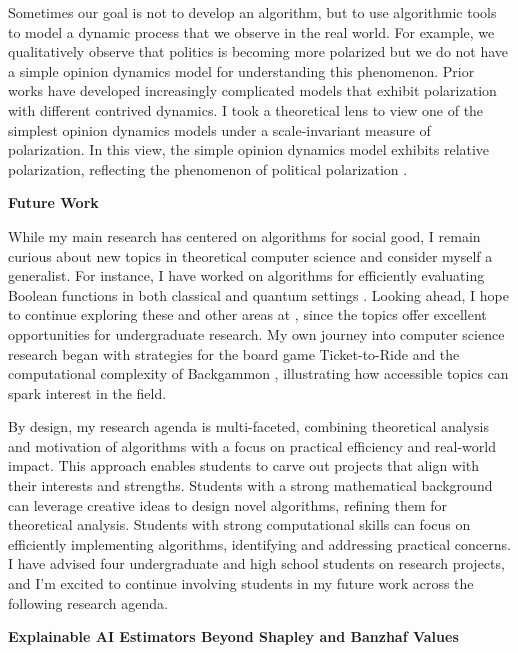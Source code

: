 \documentclass[11pt]{article}
\begin{document}
{Sometimes our goal is not to develop an algorithm, but to use algorithmic tools to model a dynamic process that we observe in the real world. For example, we qualitatively observe that politics is becoming more polarized but we do not have a simple opinion dynamics model for understanding this phenomenon. Prior works have developed increasingly complicated models that exhibit polarization with different contrived dynamics. I took a theoretical lens to view one of the simplest opinion dynamics models under a scale-invariant measure of polarization. In this view, the simple opinion dynamics model exhibits relative polarization, reflecting the phenomenon of political polarization \cite{musco2022quantify}.

\begin{center}
{\large \textbf{Future Work}}
\end{center}

While my main research has centered on algorithms for social good, I remain curious about new topics in theoretical computer science and consider myself a generalist. For instance, I have worked on algorithms for efficiently evaluating Boolean functions in both classical \cite{hellerstein2022adaptivity} and quantum settings \cite{czekanski2023robust,kimmel2021query,delorenzo2019applications}. Looking ahead, I hope to continue exploring these and other areas at \school, since the topics offer excellent opportunities for undergraduate research. My own journey into computer science research began with strategies for the board game Ticket-to-Ride \cite{witter2020applications} and the computational complexity of Backgammon \cite{witter2021backgammon}, illustrating how accessible topics can spark interest in the field.

By design, my research agenda is multi-faceted, combining theoretical analysis and motivation of algorithms with a focus on practical efficiency and real-world impact. This approach enables students to carve out projects that align with their interests and strengths. Students with a strong mathematical background can leverage creative ideas to design novel algorithms, refining them for theoretical analysis. Students with strong computational skills can focus on efficiently implementing algorithms, identifying and addressing practical concerns.
I have advised four undergraduate and high school students on research projects, and I'm excited to continue involving students in my future work across the following research agenda.

{\large \textbf{Explainable AI Estimators Beyond Shapley and Banzhaf Values}}

}
\end{document}
